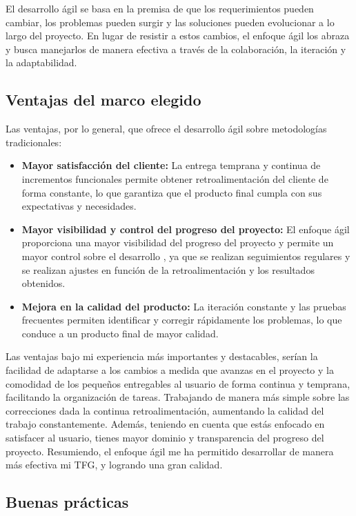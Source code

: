 El desarrollo ágil se basa en la premisa de que los requerimientos pueden cambiar, los problemas 
pueden surgir y las soluciones pueden evolucionar a lo largo del proyecto. En lugar de resistir a estos 
cambios, el enfoque ágil los abraza y busca manejarlos de manera efectiva a través de la colaboración, 
la iteración y la adaptabilidad.

\subsection{Ventajas del marco elegido}

Las ventajas, por lo general, que ofrece el desarrollo ágil sobre metodologías tradicionales:

\begin{itemize}
\item \textbf{Mayor satisfacción del cliente:} La entrega temprana y continua de incrementos 
funcionales permite obtener retroalimentación del cliente de forma constante, lo que garantiza que el 
producto final cumpla con sus expectativas y necesidades.
\item \textbf{Mayor visibilidad y control del progreso del proyecto:} El enfoque ágil proporciona una 
mayor visibilidad del progreso del proyecto y permite un mayor control sobre el desarrollo 
\cite{VCagileT}, ya que se realizan seguimientos regulares y se realizan ajustes en función de la 
retroalimentación y los resultados obtenidos.
\item \textbf{Mejora en la calidad del producto:} La iteración constante y las pruebas frecuentes 
permiten identificar y corregir rápidamente los problemas, lo que conduce a un producto final de mayor 
calidad.
\end{itemize}

Las ventajas bajo mi experiencia más importantes y destacables, serían la facilidad de adaptarse a los 
cambios a medida que avanzas en el proyecto y la comodidad de los pequeños entregables al usuario de 
forma continua y temprana, facilitando la organización de tareas. Trabajando de manera más simple sobre 
las correcciones dada la continua retroalimentación, aumentando la calidad del trabajo constantemente. 
Además, teniendo en cuenta que estás enfocado en satisfacer al usuario, tienes mayor dominio y 
transparencia del progreso del proyecto. Resumiendo, el enfoque ágil me ha permitido desarrollar de 
manera más efectiva mi TFG, y logrando una gran calidad.

\subsection{Buenas prácticas}

